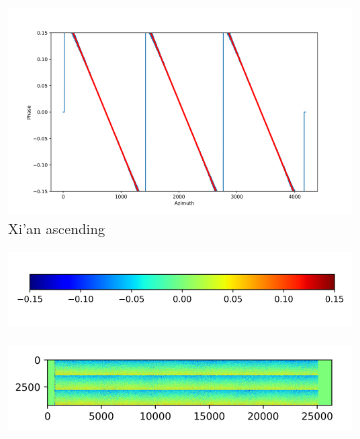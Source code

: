 \documentclass[a4paper,fleqn]{cas-sc}
\begin{document}
\begin{figure}
\begin{subfigure}{0.5\textwidth}
\begin{minipage}{0.5\textwidth}
        \end{minipage}%
        \begin{minipage}{0.5\textwidth}
            \centering
            \includegraphics[width=\textwidth]{figure/The cross-interferogram/cross_interf_XiAn_asc_row&fitted_20230109.png}
        \end{minipage}
        \caption{Xi'an ascending}
        \label{fig_5e}
    \end{subfigure}%
    \begin{subfigure}{0.5\textwidth}
        \centering
        \includegraphics[width=\textwidth]{figure/The cross-interferogram/colorbar.png}
        \caption*{}
    \end{subfigure}%
    \hfill
    \begin{subfigure}{0.5\textwidth}
        \centering
        \begin{minipage}{0.5\textwidth}
            \centering
            \includegraphics[width=\textwidth]{figure/The cross-interferogram/cross_interf_Milan_asc.png}
        \end{minipage}%
        \begin{minipage}{0.5\textwidth}

\end{minipage}
\end{subfigure}
\end{figure}
\end{document}
